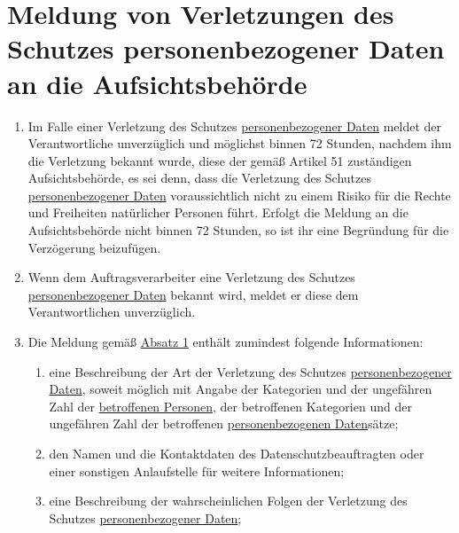 \chapter{Meldung von Verletzungen des Schutzes personenbezogener Daten an die Aufsichtsbehörde}
\label{ch:33}


\begin{enumerate}

  \item Im Falle einer Verletzung des Schutzes \hyperref[itm:04-1]{personenbezogener Daten} meldet der Verantwortliche unverzüglich und
   möglichst binnen 72 Stunden, nachdem ihm die Verletzung bekannt wurde, diese der gemäß Artikel 51 zuständigen
   Aufsichtsbehörde, es sei denn, dass die Verletzung des Schutzes \hyperref[itm:04-1]{personenbezogener Daten} voraussichtlich nicht zu
   einem Risiko für die Rechte und Freiheiten natürlicher Personen führt. Erfolgt die Meldung an die Aufsichtsbehörde
   nicht binnen 72 Stunden, so ist ihr eine Begründung für die Verzögerung beizufügen.
  \label{itm:33-1}

  \item Wenn dem Auftragsverarbeiter eine Verletzung des Schutzes \hyperref[itm:04-1]{personenbezogener Daten} bekannt wird, meldet er diese
   dem Verantwortlichen unverzüglich.
  \label{itm:33-2}

  \item Die Meldung gemäß \hyperref[itm:33-1]{Absatz 1} enthält zumindest folgende Informationen:
  \label{itm:33-3}

  \begin{enumerate}
  
    \item eine Beschreibung der Art der Verletzung des Schutzes \hyperref[itm:04-1]{personenbezogener Daten}, soweit möglich mit Angabe der
     Kategorien und der ungefähren Zahl der \hyperref[itm:04-1]{betroffenen Personen}, der betroffenen Kategorien und der ungefähren Zahl
     der betroffenen \hyperref[itm:04-1]{personenbezogenen Daten}sätze;
    \label{itm:33-3a}

    \item den Namen und die Kontaktdaten des Datenschutzbeauftragten oder einer sonstigen Anlaufstelle für weitere
     Informationen;
    \label{itm:33-3b}

    \item eine Beschreibung der wahrscheinlichen Folgen der Verletzung des Schutzes \hyperref[itm:04-1]{personenbezogener Daten};
    \label{itm:33-3c}


\end{enumerate}
\end{enumerate}
